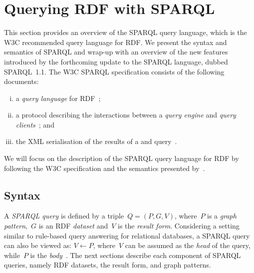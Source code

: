 


\section{Querying RDF with SPARQL}
\label{sec:sparql-preliminaries}


This section provides an overview of the SPARQL query language, which is the \ac{W3C} recommended query language for
\ac{RDF}.
%
We present the syntax and semantics of SPARQL and wrap-up with an overview of the new features introduced by the
forthcoming update to the SPARQL language, dubbed SPARQL~1.1.
%
The \ac{W3C} SPARQL specification consists of the following documents:
\begin{enumerate}[(i),noitemsep]
\item a \emph{query language} for \ac{RDF}~\cite{PrudhommeauxSeaborne:2008aa};
\item a protocol describing the interactions between a \emph{query engine} and \emph{query
    clients}~\cite{ClarkFeigenbaumTorres:2008aa}; and
\item the \ac{XML} serialisation of the results of a \SELECT and \ASK query~\cite{BeckettBroekstra:2008aa}. 
\end{enumerate}
% 
We will focus on the description of the SPARQL query language for \ac{RDF} by following the \ac{W3C} specification and the
semantics presented by~\citet{PerezArenasGutierrez:2009aa}.
%

\subsection*{Syntax}
\label{sec:sparql-syntax}

A \emph{SPARQL query} is defined by a triple~$Q=(P,G,V)$, where~$P$ is a \emph{graph pattern},~$G$ is an \ac{RDF}
\emph{dataset} and~$V$ is the \emph{result form}.
%
Considering a setting similar to rule-based query answering for relational databases, a SPARQL query can also be viewed
as:
%
$ V \leftarrow P$,
%
where~$V$ can be assumed as the \emph{head} of the query, while~$P$ is the
\emph{body}~\cite{PerezArenasGutierrez:2009aa}.
%
The next sections describe each component of SPARQL queries, namely \ac{RDF} datasets, the result form, and graph
patterns.


